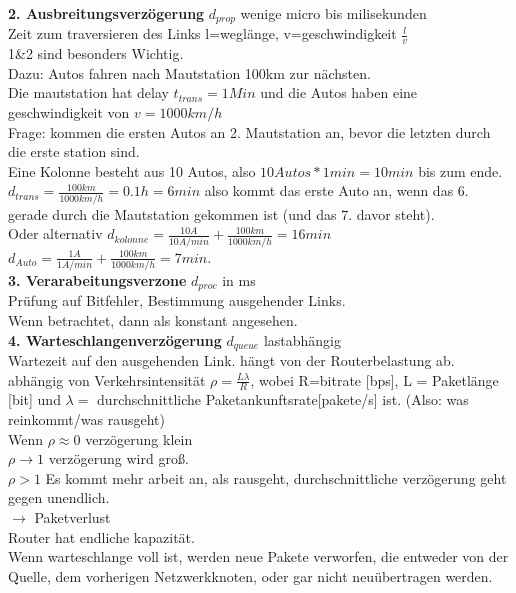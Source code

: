 \documentclass{article}
\begin{document}
	\textbf{2. Ausbreitungsverzögerung} $d_{prop}$ wenige micro bis milisekunden\\
	Zeit zum traversieren des Links l=weglänge, v=geschwindigkeit $\frac{l}{v}$\\
	1\&2 sind besonders Wichtig.\\
	Dazu: Autos fahren nach Mautstation 100km zur nächsten.\\
	Die mautstation hat delay $t_{trans} = 1Min$ und die Autos haben eine geschwindigkeit von $v=1000km/h$\\
	Frage: kommen die ersten Autos an 2. Mautstation an, bevor die letzten durch die erste station sind.\\
	Eine Kolonne besteht aus 10 Autos, also $10Autos* 1min = 10min$ bis zum ende.\\
	$d_{trans}= \frac{100km}{1000km/h} = 0.1h= 6min$ also kommt das erste Auto an, wenn das 6. gerade durch die Mautstation gekommen ist (und das 7. davor steht).\\
	Oder alternativ $d_{kolonne} = \frac{10A}{10A/min}+\frac{100km}{1000km/h}=16min$\\
	$d_{Auto} = \frac{1A}{1A/min}+\frac{100km}{1000km/h}=7min$.\\
	\textbf{3. Verarabeitungsverzone} $d_{proc}$ in ms\\
	Prüfung auf Bitfehler, Bestimmung ausgehender Links.\\
	Wenn betrachtet, dann als konstant angesehen.\\
	\textbf{4. Warteschlangenverzögerung} $d_{queue}$ lastabhängig\\
	Wartezeit auf den ausgehenden Link. hängt von der Routerbelastung ab.\\
	abhängig von Verkehrsintensität $\rho = \frac{L\lambda}{R}$, wobei R=bitrate [bps], L = Paketlänge [bit] und $\lambda=$ durchschnittliche Paketankunftsrate[pakete/s] ist. (Also: was reinkommt/was rausgeht)\\
	Wenn $\rho\approx 0$ verzögerung klein\\
	$\rho\to 1$ verzögerung wird groß.\\
	$\rho>1$ Es kommt mehr arbeit an, als rausgeht, durchschnittliche verzögerung geht gegen unendlich.\\
	$\to$ Paketverlust\\
	Router hat endliche kapazität.\\
	Wenn warteschlange voll ist, werden neue Pakete verworfen, die entweder von der Quelle, dem vorherigen Netzwerkknoten, oder gar nicht neuübertragen werden.\\
\end{document}
